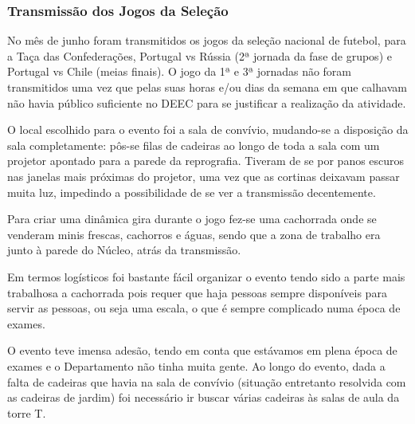 
\subsubsection{Transmissão dos Jogos da Seleção}

No mês de junho foram transmitidos os jogos da seleção nacional de futebol, para a Taça das Confederações, Portugal vs Rússia (2ª jornada da fase de grupos) e Portugal vs Chile (meias finais). O jogo da 1ª e 3ª jornadas não foram transmitidos uma vez que pelas suas horas e/ou dias da semana em que calhavam não havia público suficiente no DEEC para se justificar a realização da atividade.

O local escolhido para o evento foi a sala de convívio, mudando-se a disposição da sala completamente: pôs-se filas de cadeiras ao longo de toda a sala com um projetor apontado para a parede da reprografia. Tiveram de se por panos escuros nas janelas mais próximas do projetor, uma vez que as cortinas deixavam passar muita luz, impedindo a possibilidade de se ver a transmissão decentemente.

Para criar uma dinâmica gira durante o jogo fez-se uma cachorrada onde se venderam minis frescas, cachorros e águas, sendo que a zona de trabalho era junto à parede do Núcleo, atrás da transmissão.

{ %
Em termos logísticos foi bastante fácil organizar o evento tendo sido a parte mais trabalhosa a cachorrada pois requer que haja pessoas sempre disponíveis para servir as pessoas, ou seja uma escala, o que é sempre complicado numa época de exames.
}
{ %
}

O evento teve imensa adesão, tendo em conta que estávamos em plena época de exames e o Departamento não tinha muita gente. Ao longo do evento, dada a falta de cadeiras que havia na sala de convívio (situação entretanto resolvida com as cadeiras de jardim) foi necessário ir buscar várias cadeiras às salas de aula da torre T.